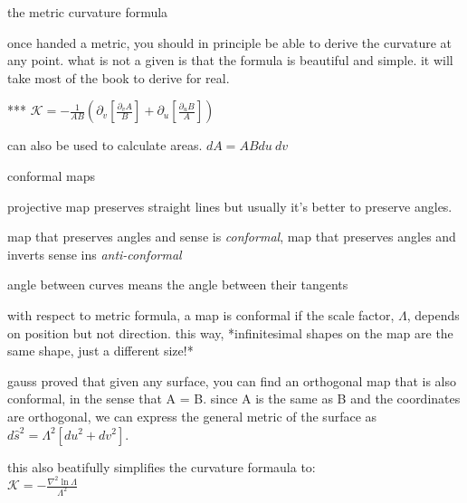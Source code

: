 \documentclass{article}
\newenvironment{andrew_section}[1]
    {
    \section{#1}
    \begin{itemize}
    }
    {
    \end{itemize}
    }
\begin{document}
\begin{andrew_section}{the metric curvature formula}
    \item 
        once handed a metric, you should in principle be able to derive the
        curvature at any point.  what is not a given is that the formula is
        beautiful and simple.  it will take most of the book to derive for real.
    \item 
        *** $\mathcal{K} = - \frac{1}{AB}(\partial_v [\frac{\partial_v A}{B}] + \partial_u [\frac{\partial_u B}{A}])$
        
    \item 
        can also be used to calculate areas. $ dA = ABdu \ dv$ 
\end{andrew_section}

\begin{andrew_section}{conformal maps}
    \item 
        projective map preserves straight lines but usually it's better 
        to preserve angles.
    \item 
        map that preserves angles and sense is \emph{conformal},
        map that preserves angles and inverts sense ins \emph{anti-conformal}
    \item 
        angle between curves means the angle between their tangents
    \item 
        with respect to metric formula, a map is conformal if the scale
        factor, $\Lambda$, depends on position but not direction.
        this way, *infinitesimal shapes on the map are the same shape, just
        a different size!*
    \item 
        gauss proved that given any surface, you can find an orthogonal map
        that is also conformal, in the sense that A = B.  since A is the same as B
        and the coordinates are orthogonal, we can express the general metric
        of the surface as \\
         $ d\hat{s}^2 = \Lambda^2 [du^2 + dv^2]$.
        \item 
            this also beatifully simplifies the curvature formaula to: \\
            $\mathcal{K} = - \frac{\nabla^2 \ln \Lambda}{\Lambda^2}$
\end{andrew_section}
\end{document}
